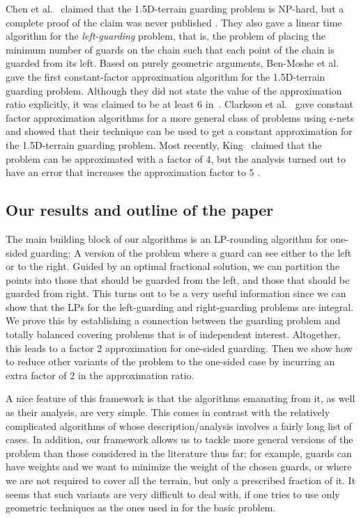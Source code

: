 \documentclass[11pt]{article}
\begin{document}
Chen et al.~\cite{conf/cccg/ChenEU95} claimed that the 1.5D-terrain guarding
problem is NP-hard, but a complete proof of the claim was never published
\cite{conf/cccg/DemaineO06,conf/latin/King06,journals/siamcomp/Ben-MosheKM07}. They
also gave a linear time algorithm for the \emph{left-guarding} problem, that
is, the problem of placing the minimum number of guards on the chain such that
each point of the chain is guarded from its left.  Based on purely geometric
arguments, Ben-Moshe et al.~\cite{journals/siamcomp/Ben-MosheKM07} gave the
first constant-factor approximation algorithm for the 1.5D-terrain guarding
problem. Although they did not state the value of the approximation ratio
explicitly, it was claimed to be at least 6
in~\cite{conf/latin/King06}. Clarkson et al.~\cite{conf/compgeom/ClarksonV05}
gave constant factor approximation algorithms for a more general class of
problems using $\epsilon$-nets and showed that their technique can be used to
get a constant approximation for the 1.5D-terrain guarding problem. Most
recently, King~\cite{conf/latin/King06} claimed that the problem can be
approximated with a factor of 4, but the analysis turned out to have an error
that increases the approximation factor to $5$ \cite{misc/errata/King}.

\subsection{Our results and outline of the paper}
\label{sec:our-results}

The main building block of our algorithms is an LP-rounding algorithm for
one-sided guarding: A version of the problem where a guard can see either to
the left or to the right. Guided by an optimal fractional solution, we can
partition the points into those that should be guarded from the left, and
those that should be guarded from right. This turns out to be a very useful
information since we can show that the LPs for the left-guarding and
right-guarding problems are integral. We prove this by establishing a
connection between the guarding problem and totally balanced covering problems
that is of independent interest. Altogether, this leads to a factor 2
approximation for one-sided guarding. Then we show how to reduce other
variants of the problem to the one-sided case by incurring an extra factor of
2 in the approximation ratio.

A nice feature of this framework is that the algorithms emanating from it, as
well as their analysis, are very simple. This comes in contrast with the
relatively complicated algorithms of
\cite{journals/siamcomp/Ben-MosheKM07,conf/latin/King06} whose
description/analysis involves a fairly long list of cases.  In addition, our
framework allows us to tackle more general versions of the problem than those
considered in the literature thus far; for example, guards can have weights
and we want to minimize the weight of the chosen guards, or where we are not
required to cover all the terrain, but only a prescribed fraction of it. It
seems that such variants are very difficult to deal with, if one tries to use
only geometric techniques as the ones used in
\cite{journals/siamcomp/Ben-MosheKM07,conf/latin/King06} for the basic
problem.
\end{document}
